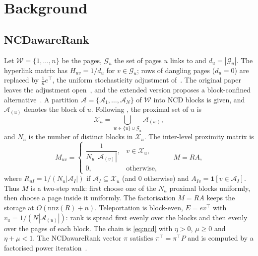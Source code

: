 \documentclass[11pt,a4paper]{article}
\theoremstyle{definition}
\theoremstyle{remark}
\begin{document}
\section{Background}
\label{sec:background}

\subsection{NCDawareRank}
Let $\mathcal W=\{1,\dots,n\}$ be the pages, $\mathcal G_u$ the set of pages $u$ links to and
$d_u=|\mathcal G_u|$. The hyperlink matrix has $H_{uv}=1/d_u$ for $v\in\mathcal G_u$; rows of dangling
pages ($d_u=0$) are replaced by $\frac1n e^\top$, the uniform stochasticity adjustment of~\cite{page99}.
The original paper leaves the adjustment open~\cite{ng13}, and the extended version proposes a
block-confined alternative~\cite{ng20}. A partition $\mathcal A=\{\mathcal A_1,\dots,\mathcal A_N\}$ of
$\mathcal W$ into NCD blocks is given, and $\mathcal A_{(u)}$ denotes the block of $u$. Following
\cite[§3.1]{ng13}, the proximal set of $u$ is
\[
\mathcal X_u=\textstyle\bigcup_{w\in\{u\}\cup\mathcal G_u}\mathcal A_{(w)},
\]
and $N_u$ is the number of distinct blocks in $\mathcal X_u$. The inter-level proximity matrix is
\begin{equation}
M_{uv}=\begin{cases}\dfrac{1}{N_u\,|\mathcal A_{(v)}|},& v\in\mathcal X_u,\\[4pt] 0,&\text{otherwise,}\end{cases}
\qquad M=RA,
\label{eq:M}
\end{equation}
where $R_{uI}=1/(N_u|\mathcal A_I|)$ if $\mathcal A_I\subseteq\mathcal X_u$ (and $0$ otherwise) and
$A_{Iv}=\mathbf 1[v\in\mathcal A_I]$. Thus $M$ is a two-step walk: first choose one of the $N_u$ proximal
blocks uniformly, then choose a page inside it uniformly. The factorisation $M=RA$ keeps the storage at
$O(\mathrm{nnz}(R)+n)$. Teleportation is block-even, $E=ev^\top$ with $v_u=1/(N|\mathcal A_{(u)}|)$:
rank is spread first evenly over the blocks and then evenly over the pages of each block. The chain is
\eqref{eq:ncd} with $\eta>0$, $\mu\ge0$ and $\eta+\mu<1$. The NCDawareRank vector $\pi$ satisfies
$\pi^\top=\pi^\top P$ and is computed by a factorised power iteration~\cite[Alg.~1]{ng13}.
\end{document}
